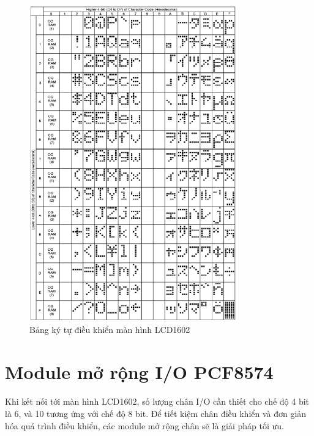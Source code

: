 \begin{figure}[H]
    \centering
    \includegraphics[width=0.8\textwidth]{images/Asciichart.png}
    \caption{Bảng ký tự điều khiển màn hình LCD1602}
    \label{fig:enter-label}
\end{figure}

\section{Module mở rộng I/O PCF8574}
\paragraph{}
Khi kết nối tới màn hình LCD1602, số lượng chân I/O cần thiết cho chế độ 4 bit là 6, và 10 tương ứng với chế độ 8 bit. Để tiết kiệm chân điều khiển và đơn giản hóa quá trình điều khiển, các module mở rộng chân sẽ là giải pháp tối ưu.
